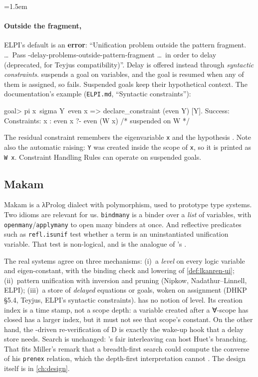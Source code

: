 \begingroup\emergencystretch=1.5em
\paragraph{Outside the fragment,} ELPI's default is an \textbf{error}: \enquote{Unification problem
outside the pattern fragment. \dots\ Pass -delay-problems-outside-pattern-fragment \dots\ in order to
delay (deprecated, for Teyjus compatibility)}. Delay is offered instead through \emph{syntactic
constraints}.  suspends a goal on variables, and the goal is resumed
when any of them is assigned, so  fails. Suspended goals keep
their hypothetical context. The documentation's example (\texttt{ELPI.md}, \enquote{Syntactic
constraints}):\par\endgroup
\begin{answers}
goal> pi x\ sigma Y\ even x => declare_constraint (even Y) [Y].
Success:
Constraints:
 {x} : even x ?- even (W x)  /* suspended on W */
\end{answers}
\noindent The residual constraint remembers the eigenvariable \texttt{x} and the hypothesis
. Note also the automatic raising: \texttt{Y} was created inside the scope of \texttt{x}, so
it is printed as \texttt{W x}. Constraint Handling Rules can operate on suspended goals.

\subsection{Makam}

Makam \cite{StampoulisChlipala2018} is a λProlog dialect with polymorphism, used to prototype type
systems. Two idioms are relevant for us. \texttt{bindmany} is a binder over a \emph{list} of
variables, with \texttt{openmany}/\texttt{applymany} to open many binders at once. And reflective
predicates such as \texttt{refl.isunif} test whether a term is an uninstantiated unification
variable. That test is non-logical, and is the analogue of \micro{}'s .

\begin{kanren}
The real systems agree on three mechanisms:
(i)~a \emph{level} on every logic variable and eigen-constant, with the binding check and lowering
    of \cref{def:lkanren-ui}; (ii)~pattern unification with inversion and pruning (Nipkow, Nadathur--Linnell, ELPI); (iii)~a store of \emph{delayed} equations or goals, woken on assignment (DHKP §5.4, Teyjus, ELPI's
    syntactic constraints).
\micro{} has no notion of level. Its creation index is a time stamp, not a scope depth: a variable
created after a ∀-scope has closed has a larger index, but it must not see that scope's constant. On
the other hand, the -driven re-verification of D is exactly the wake-up hook that a delay
store needs. Search is unchanged: 's fair interleaving can host Huet's branching. That fits
Miller's remark that a breadth-first search could compute the converse of his \texttt{prenex}
relation, which the depth-first interpretation cannot \cite{Miller1991}. The design itself is in \cref{ch:design}.
\end{kanren}

